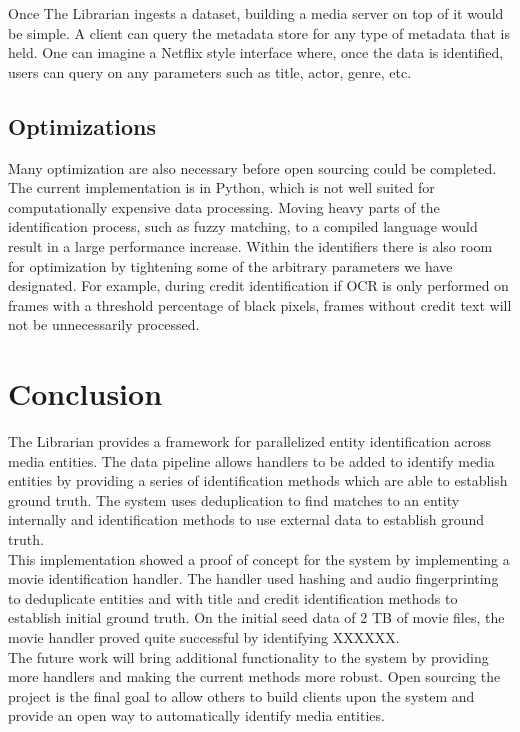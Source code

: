 \documentclass[paper=a4, fontsize=11pt]{scrartcl} %
\numberwithin{equation}{section} %
\numberwithin{figure}{section} %
\numberwithin{table}{section} %
\begin{document}
Once The Librarian ingests a dataset, building a media server on top of it would be simple. A client can query the metadata store for any type of metadata that is held. One can imagine a Netflix style interface where, once the data is identified, users can query on any parameters such as title, actor, genre, etc. \\

\subsection{Optimizations}
\label{sec:optimizations}
Many optimization are also necessary before open sourcing could be completed. The current implementation is in Python, which is not well suited for computationally expensive data processing. Moving heavy parts of the identification process, such as fuzzy matching, to a compiled language would result in a large performance increase. Within the identifiers there is also room for optimization by tightening some of the arbitrary parameters we have designated. For example, during credit identification if OCR is only performed on frames with a threshold percentage of black pixels, frames without credit text will not be unnecessarily processed. \\


\section{Conclusion}
\label{sec:conclusion}

The Librarian provides a framework for parallelized entity identification across media entities. The data pipeline allows handlers to be added to identify media entities by providing a series of identification methods which are able to establish ground truth. The system uses deduplication to find matches to an entity internally and identification methods to use external data to establish ground truth. \\

This implementation showed a proof of concept for the system by implementing a movie identification handler. The handler used hashing and audio fingerprinting to deduplicate entities and with title and credit identification methods to establish initial ground truth. On the initial seed data of 2 TB of movie files, the movie handler proved quite successful by identifying XXXXXX. \\

The future work will bring additional functionality to the system by providing more handlers and making the current methods more robust. Open sourcing the project is the final goal to allow others to build clients upon the system and provide an open way to automatically identify media entities. \\

\end{document}
